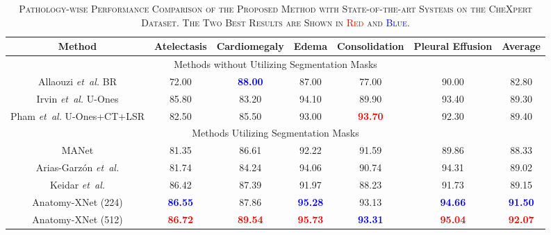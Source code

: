 \documentclass[journal]{IEEEtran}
\newcommand{\etal}{\emph{et~al.}}
\begin{document}
\begin{table*}[!t]
    \centering
    \caption{\textsc{Pathology-wise Performance Comparison of the Proposed Method with State-of-the-art Systems on the CheXpert Dataset. 
    The Two Best Results are Shown in \textcolor{red}{Red} and \textcolor{blue}{Blue}.}}
    \label{chexpert_comparison}
    \begin{tabular}{c|ccccc|c} 
    \toprule
    \bf Method & \bf Atelectasis & \bf Cardiomegaly & \bf Edema & \bf Consolidation & \bf Pleural Effusion & \bf Average \\
    \hline\hline
    \multicolumn{7}{c}{Methods without Utilizing Segmentation Masks} \\
    \hline
    Allaouzi \etal \cite{8719904} BR & 72.00 & \textcolor{blue}{\bf 88.00} & 87.00 & 77.00 & 90.00 & 82.80 \\
    Irvin \etal \cite{irvin2019chexpert} U-Ones & 85.80 & 83.20 & 94.10 & 89.90 & 93.40 & 89.30 \\
    Pham \etal \cite{PHAM2021186} U-Ones+CT+LSR & 82.50 & 85.50 & 93.00 & \textcolor{red}{\bf 93.70} & 92.30 & 89.40 \\
    \hline
    \multicolumn{7}{c}{Methods Utilizing Segmentation Masks} \\
    \hline
    MANet \cite{XU202196} & 81.35 & 86.61 &	92.22 &	91.59 & 89.86	& 88.33 \\
    Arias-Garzón \etal \cite{ARIASGARZON2021100138} & 81.74	& 84.24 & 94.06 & 90.74 & 94.31 & 89.02 \\
    Keidar \etal \cite{Keidar2021} & 86.42 & 87.39 & 91.97 & 88.23 & 91.73 & 89.15 \\
    Anatomy-XNet (224) & \textcolor{blue}{\bf 86.55} & 87.86 & \textcolor{blue}{\bf 95.28} & 93.13 & \textcolor{blue}{\bf 94.66} & \textcolor{blue}{\bf 91.50} \\
    Anatomy-XNet (512) & \textcolor{red}{\bf 86.72} & \textcolor{red}{\bf 89.54} & \textcolor{red}{\bf 95.73} & \textcolor{blue}{\bf 93.31} & \textcolor{red}{\bf 95.04} & \textcolor{red}{\bf 92.07} \\
    \bottomrule 
    \end{tabular}
\end{table*}
\end{document}
